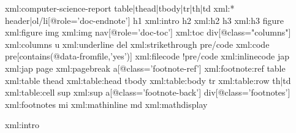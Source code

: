 \startxmlsetups xml:computer-science-report
  \xmlsetsetup{\xmldocument}
    {table|thead|tbody|tr|th|td}
    {xml:*}
  \xmlsetsetup{\xmldocument}
    {header|ol/li[@role='doc-endnote']}
    {}
  \xmlsetsetup{\xmldocument}
    {h1}
    {xml:intro}
  \xmlsetsetup{\xmldocument}
    {h2}
    {xml:h2}
  \xmlsetsetup{\xmldocument}
    {h3}
    {xml:h3}
  \xmlsetsetup{\xmldocument}
    {figure}
    {xml:figure}
  \xmlsetsetup{\xmldocument}
    {img}
    {xml:img}
  \xmlsetsetup{\xmldocument}
    {nav[@role='doc-toc']}
    {xml:toc}
  \xmlsetsetup{\xmldocument}
    {div[@class="columns"]}
    {xml:columns}
  \xmlsetsetup{\xmldocument}
    {u}
    {xml:underline}
  \xmlsetsetup{\xmldocument}
    {del}
    {xml:strikethrough}
  \xmlsetsetup{\xmldocument}
    {pre/code}
    {xml:code}
  \xmlsetsetup{\xmldocument}
    {pre[contains(@data-fromfile,'yes')]}
    {xml:filecode}
  \xmlsetsetup{\xmldocument}
    {!pre/code}
    {xml:inlinecode}
  \xmlsetsetup{\xmldocument}
    {jap}
    {xml:jap}
  \xmlsetsetup{\xmldocument}
    {page}
    {xml:pagebreak}
  \xmlsetsetup{\xmldocument}
    {a[@class='footnote-ref']}
    {xml:footnote:ref}
  \xmlsetsetup{\xmldocument}
    {table}
    {xml:table}
  \xmlsetsetup{\xmldocument}
    {thead}
    {xml:table:head}
  \xmlsetsetup{\xmldocument}
    {tbody}
    {xml:table:body}
  \xmlsetsetup{\xmldocument}
    {tr}
    {xml:table:row}
  \xmlsetsetup{\xmldocument}
    {th|td}
    {xml:table:cell}
  \xmlsetsetup{\xmldocument}
    {sup}
    {xml:sup}
  \xmlsetsetup{\xmldocument}
    {a[@class='footnote-back']}
    {}
  \xmlsetsetup{\xmldocument}
    {div[@class='footnotes']}
    {xml:footnotes}
  \xmlsetsetup{\xmldocument}
    {mi}
    {xml:mathinline}
  \xmlsetsetup{\xmldocument}
    {md}
    {xml:mathdisplay}
\stopxmlsetups


\setuphead[intro][number=no,page=no,incrementnumber=list]

\startxmlsetups xml:intro
    {\page[disable]} %
    {\page} %
\stopxmlsetups

